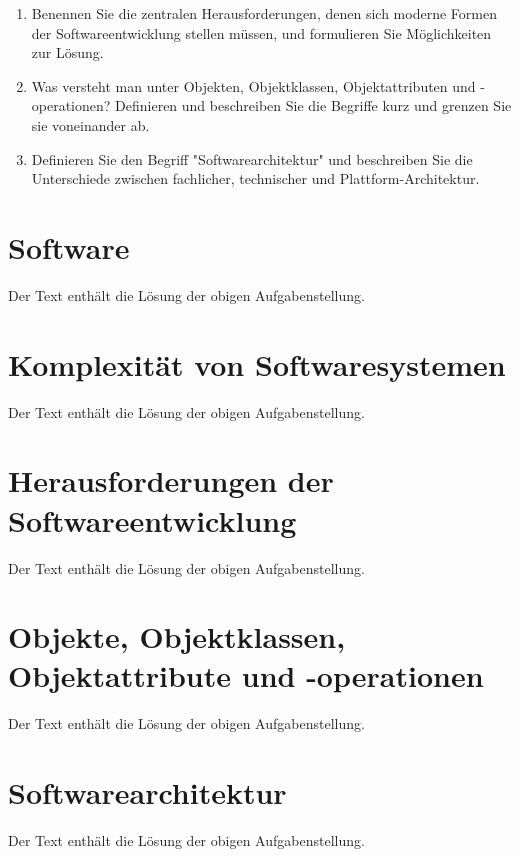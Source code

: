 \begin{universityTask}
\begin{enumerate}[label=(\alph*)]
\begin{quotation}
\begin{itshape}
                \end{itshape}
            \end{quotation}
            \pagebreak
        \item Benennen Sie die zentralen Herausforderungen, denen sich moderne Formen der Softwareentwicklung stellen müssen, und formulieren Sie Möglichkeiten zur Lösung.
        \item Was versteht man unter Objekten, Objektklassen, Objektattributen und -operationen? Definieren und beschreiben Sie die Begriffe kurz und grenzen Sie sie voneinander ab.
        \item Definieren Sie den Begriff "Softwarearchitektur" und beschreiben Sie die Unterschiede zwischen fachlicher, technischer und Plattform-Architektur.
    \end{enumerate}
\end{universityTask}

\section{Software}
\label{sec:01-01_software}

Der Text enthält die Lösung der obigen Aufgabenstellung.

\section{Komplexität von Softwaresystemen}
\label{sec:01-02_complexity-of-software-systems}

Der Text enthält die Lösung der obigen Aufgabenstellung.

\section{Herausforderungen der Softwareentwicklung}
\label{sec:01-03_challenges-of-software-development}

Der Text enthält die Lösung der obigen Aufgabenstellung.

\section{Objekte, Objektklassen, Objektattribute und -operationen}
\label{sec:01-04_objects-classes-attributes-and-operations}

Der Text enthält die Lösung der obigen Aufgabenstellung.

\section{Softwarearchitektur}
\label{sec:01-05_software-architecture}

Der Text enthält die Lösung der obigen Aufgabenstellung.